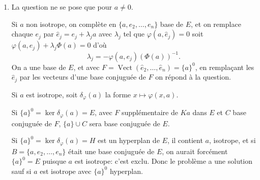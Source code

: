 \begin{enumerate}[label=\arabic*.,leftmargin=2.2em,itemsep=1.1em]
\item La question ne se pose que pour $a\ne0$.

Si $a$ non isotrope, on complète en $\{a,e_2,\ldots,e_n\}$ base de $E$, et on remplace chaque $e_j$ par $\hat e_j=e_j+\lambda_ja$ avec $\lambda_j$ tel que $\varphi(a,\hat e_j)=0$ soit $\varphi(a,e_j)+\lambda_j\Phi(a)=0$ d'où
\[
\lambda_j=-\varphi(a,e_j)(\Phi(a))^{-1}.
\]
On a une base de $E$, et avec $F=\operatorname{Vect}(\hat e_2,\ldots,\hat e_n)=\{a\}^0$, en remplaçant les $\hat e_j$ par les vecteurs d'une base conjuguée de $F$ on répond à la question.

Si $a$ est isotrope, soit $\delta_\varphi(a)$ la forme $x\longmapsto\varphi(x,a)$.

Si $\{a\}^0=\ker\delta_\varphi(a)=E$, avec $F$ supplémentaire de $Ka$ dans $E$ et $C$ base conjuguée de $F$, $\{a\}\cup C$ sera base conjuguée de $E$.

Si $\{a\}^0=\ker\delta_\varphi(a)=H$ est un hyperplan de $E$, il contient $a$, isotrope, et si $B=\{a,e_2,\ldots,e_n\}$ était une base conjuguée de $E$, on aurait forcément $\{a\}^0=E$ puisque $a$ est isotrope: c'est exclu. Donc le problème a une solution sauf si $a$ est isotrope avec $\{a\}^0$ hyperplan.

\end{enumerate}
